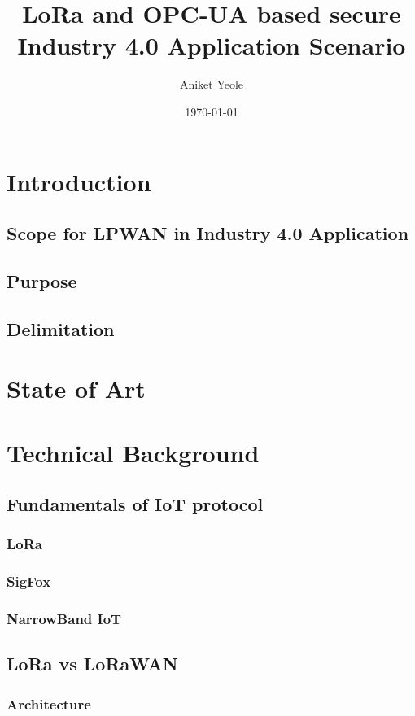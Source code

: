 \documentclass{book}
\author{Aniket Yeole}
\title{LoRa and OPC-UA based secure Industry 4.0 Application Scenario}
\date{\today}
\begin{document}
\maketitle
\tableofcontents
\chapter{Introduction}
\section{Scope for LPWAN in Industry 4.0 Application}
\section{Purpose}
\section{Delimitation}

\chapter{State of Art}
\section{}

\chapter{Technical Background}
\section{Fundamentals of IoT protocol}
\subsection{LoRa}
\subsection{SigFox}
\subsection{NarrowBand IoT}
\section{LoRa vs LoRaWAN}
\subsection{Architecture}
\end{document}
